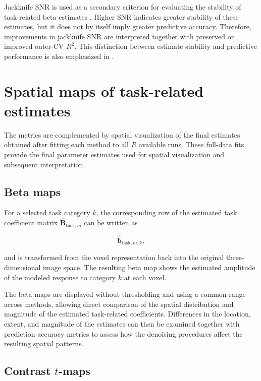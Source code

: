 \documentclass[english]{pwr_wmat_praca_dyplomowa}
\theoremstyle{definition}
\theoremstyle{remark}
\begin{document}
Jackknife SNR is used as a secondary criterion for evaluating the stability of task-related beta estimates \cite{glm-denoise}. Higher SNR indicates greater stability of these estimates, but it does not by itself imply greater predictive accuracy. Therefore, improvements in jackknife SNR are interpreted together with preserved or improved outer-CV $R^2$. This distinction between estimate stability and predictive performance is also emphasized in \cite{glm-denoise}.


\section{Spatial maps of task-related estimates}
\label{section:evaluation-maps}

The metrics are complemented by spatial visualization of the final estimates obtained after fitting each method to all $R$ available runs. These full-data fits provide the final parameter estimates used for spatial visualization and subsequent interpretation.

\subsection{Beta maps}

For a selected task category $k$, the corresponding row of the estimated task coefficient matrix $\widehat{\mathbf{B}}_{\mathrm{task},m}$ can be written as

\begin{equation}
    \widehat{\mathbf{b}}_{\mathrm{task},m,k},
\end{equation}

and is transformed from the voxel representation back into the original three-dimensional image space. The resulting beta map shows the estimated amplitude of the modeled response to category $k$ at each voxel.

The beta maps are displayed without thresholding and using a common range across methods, allowing direct comparison of the spatial distribution and magnitude of the estimated task-related coefficients. Differences in the location, extent, and magnitude of the estimates can then be examined together with prediction accuracy metrics to assess how the denoising procedures affect the resulting spatial patterns.

\subsection{Contrast \texorpdfstring{$t$}{t}-maps}
\end{document}
